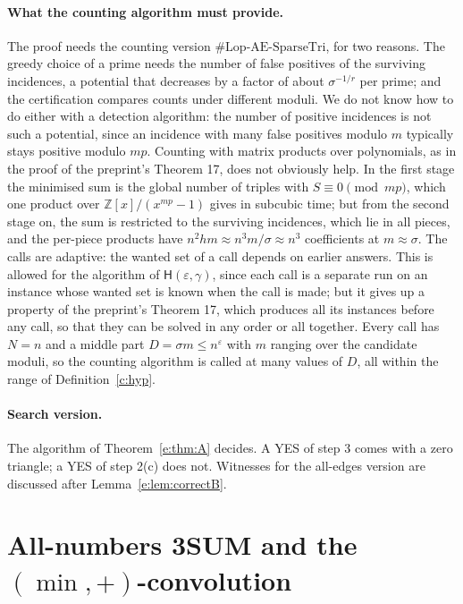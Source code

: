 \documentclass[11pt]{article}
\theoremstyle{definition}
\theoremstyle{remark}
\newcommand{\Z}{\mathbb{Z}}
\newcommand{\Lop}{\mathrm{Lop}\text{-}\allowbreak\mathrm{AE}\text{-}\allowbreak\mathrm{SparseTri}}
\newcommand{\Hyp}{\mathsf{H}}
\begin{document}
\paragraph{What the counting algorithm must provide.} The proof needs the counting version $\#\Lop$, for two reasons. The greedy choice of a prime needs the number of false positives of the surviving incidences, a potential that decreases by a factor of about $\sigma^{-1/r}$ per prime; and the certification compares counts under different moduli. We do not know how to do either with a detection algorithm: the number of positive incidences is not such a potential, since an incidence with many false positives modulo $m$ typically stays positive modulo $mp$. Counting with matrix products over polynomials, as in the proof of the preprint's Theorem 17, does not obviously help. In the first stage the minimised sum is the global number of triples with $S\equiv0\pmod{mp}$, which one product over $\Z[x]/(x^{mp}-1)$ gives in subcubic time; but from the second stage on, the sum is restricted to the surviving incidences, which lie in all pieces, and the per-piece products have $n^2hm\approx n^3m/\sigma\approx n^3$ coefficients at $m\approx\sigma$. The calls are adaptive: the wanted set of a call depends on earlier answers. This is allowed for the algorithm of $\Hyp(\varepsilon,\gamma)$, since each call is a separate run on an instance whose wanted set is known when the call is made; but it gives up a property of the preprint's Theorem 17, which produces all its instances before any call, so that they can be solved in any order or all together. Every call has $N=n$ and a middle part $D=\sigma m\le n^\varepsilon$ with $m$ ranging over the candidate moduli, so the counting algorithm is called at many values of $D$, all within the range of Definition~\ref{c:hyp}.

\paragraph{Search version.} The algorithm of Theorem~\ref{e:thm:A} decides. A YES of step 3 comes with a zero triangle; a YES of step 2(c) does not. Witnesses for the all-edges version are discussed after Lemma~\ref{e:lem:correctB}.

\section{All-numbers 3SUM and the \texorpdfstring{$(\min,+)$}{(min,+)}-convolution}\label{s:sec:allnum}
\end{document}
